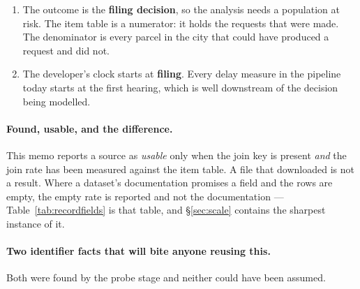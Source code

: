 \documentclass[11pt]{article}
\begin{document}
\begin{enumerate}
\item The outcome is the \textbf{filing decision}, so the analysis needs a population at
risk. The item table is a numerator: it holds the requests that were made. The denominator is
every parcel in the city that could have produced a request and did not.
\item The developer's clock starts at \textbf{filing}. Every delay measure in the pipeline
today starts at the first hearing, which is well downstream of the decision being modelled.
\end{enumerate}

\paragraph{Found, usable, and the difference.} This memo reports a source as \emph{usable}
only when the join key is present \emph{and} the join rate has been measured against the item
table. A file that downloaded is not a result. Where a dataset's documentation promises a
field and the rows are empty, the empty rate is reported and not the documentation ---
Table~\ref{tab:recordfields} is that table, and \S\ref{sec:scale} contains the sharpest
instance of it.

\paragraph{Two identifier facts that will bite anyone reusing this.} Both were found by the
probe stage and neither could have been assumed.
\end{document}
